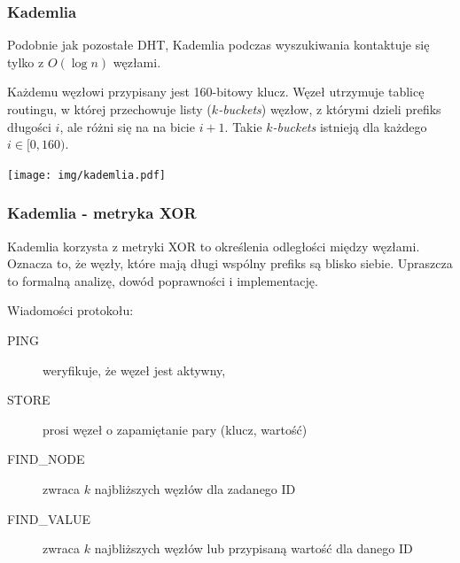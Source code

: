 \documentclass{beamer}
\begin{document}
\begin{frame}
\frametitle{Kademlia \citep{maymounkov2002kademlia}}
\begin{block}{}
Podobnie jak pozostałe DHT, Kademlia podczas wyszukiwania kontaktuje się tylko z $O(\log n)$ węzłami.
\end{block}

\pause

\begin{block}{}
Każdemu węzłowi przypisany jest 160-bitowy klucz. Węzeł utrzymuje tablicę routingu, w której przechowuje listy (\textit{$k$-buckets}) węzłow, z którymi dzieli prefiks długości $i$, ale różni się na na bicie $i+1$.
Takie \textit{$k$-buckets} istnieją dla każdego $i \in [0, 160)$.
\end{block}

\begin{center}
\texttt{[image: img/kademlia.pdf]}
\end{center}

\end{frame}

\begin{frame}
\frametitle{Kademlia - metryka XOR}

\begin{block}{}
Kademlia korzysta z metryki XOR to określenia odległości między węzłami. Oznacza to, że węzły, które mają długi wspólny prefiks są blisko siebie. Upraszcza to formalną analizę, dowód poprawności i implementację.
\end{block}

\pause

\begin{block}{}
Wiadomości protokołu:
\begin{description}
\item[PING] weryfikuje, że węzeł jest aktywny,
\item[STORE] prosi węzeł o zapamiętanie pary (klucz, wartość)
\item[FIND\_NODE] zwraca $k$ najbliższych węzłów dla zadanego ID
\item[FIND\_VALUE] zwraca $k$ najbliższych węzłów lub przypisaną wartość dla danego ID
\end{description}
\end{block}

\end{frame}
\end{document}
